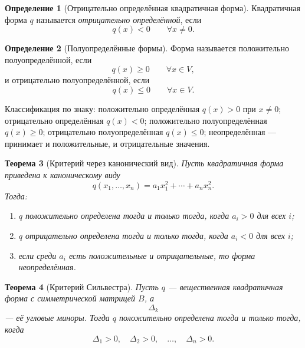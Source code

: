 \documentclass[12pt,a4paper]{article}
\theoremstyle{definition}
\newtheorem{definition}{Определение}[section]
\theoremstyle{plain}
\newtheorem{theorem}[definition]{Теорема}
\theoremstyle{remark}
\newenvironment{knowledgefix}{\begin{clarifybox}}{\end{clarifybox}}
\begin{document}
\begin{definition}[Отрицательно определённая квадратичная форма]
Квадратичная форма $q$ называется \emph{отрицательно определённой}, если
\[
    q(x)<0
    \qquad \forall x\ne0.
\]
\end{definition}

\begin{definition}[Полуопределённые формы]
Форма называется положительно полуопределённой, если
\[
    q(x)\ge0
    \qquad \forall x\in V,
\]
и отрицательно полуопределённой, если
\[
    q(x)\le0
    \qquad \forall x\in V.
\]
\begin{knowledgefix}
Классификация по знаку: положительно определённая \(q(x)>0\) при \(x\ne0\); отрицательно определённая \(q(x)<0\); положительно полуопределённая \(q(x)\ge0\); отрицательно полуопределённая \(q(x)\le0\); неопределённая — принимает и положительные, и отрицательные значения.
\end{knowledgefix}
\end{definition}

\begin{theorem}[Критерий через канонический вид]
Пусть квадратичная форма приведена к каноническому виду
\[
    q(x_1,
    \ldots,x_n)=a_1x_1^2+
    \cdots+a_nx_n^2.
\]
Тогда:
\begin{enumerate}[label=\arabic*)]
    \item $q$ положительно определена тогда и только тогда, когда $a_i>0$ для всех $i$;
    \item $q$ отрицательно определена тогда и только тогда, когда $a_i<0$ для всех $i$;
    \item если среди $a_i$ есть положительные и отрицательные, то форма неопределённая.
\end{enumerate}
\end{theorem}

\begin{theorem}[Критерий Сильвестра]
Пусть $q$ --- вещественная квадратичная форма с симметрической матрицей $B$, а
\[
    \Delta_k
\]
--- её угловые миноры. Тогда $q$ положительно определена тогда и только тогда, когда
\[
    \Delta_1>0,
    \quad
    \Delta_2>0,
    \quad
    \ldots,
    \quad
    \Delta_n>0.
\]
\end{theorem}
\end{document}
